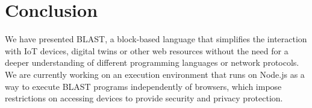 \documentclass[runningheads]{llncs}
\begin{document}
\section{Conclusion}

We have presented BLAST, a block-based language that simplifies the interaction with IoT devices, digital twins or other web resources without the need for a deeper understanding of different programming languages or network protocols.
We are currently working on an execution environment that runs on Node.js as a way to execute BLAST programs independently of browsers, which impose restrictions on accessing devices to provide security and privacy protection.

%
%
%


%
\end{document}
